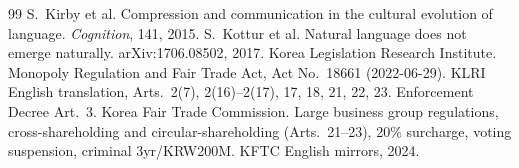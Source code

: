 \documentclass[11pt,openany]{book}
\begin{document}
\begin{thebibliography}{99}
 S.\ Kirby et al. Compression and communication in the cultural evolution of language. \textit{Cognition}, 141, 2015.
 S.\ Kottur et al. Natural language does not emerge naturally. arXiv:1706.08502, 2017.
 Korea Legislation Research Institute. Monopoly Regulation and Fair Trade Act, Act No.\ 18661 (2022-06-29). KLRI English translation, Arts.\ 2(7), 2(16)--2(17), 17, 18, 21, 22, 23. Enforcement Decree Art.\ 3.
 Korea Fair Trade Commission. Large business group regulations, cross-shareholding and circular-shareholding (Arts.\ 21--23), 20\% surcharge, voting suspension, criminal 3yr/KRW200M. KFTC English mirrors, 2024.
\end{thebibliography}
\end{document}
